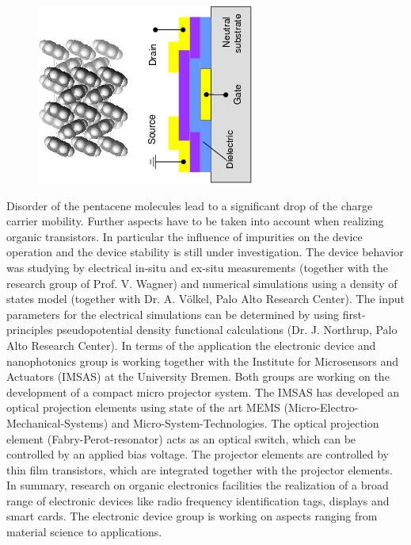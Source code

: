 \begin{figure}[ht]
  \begin{center}
    \includegraphics[width=\hsize,angle=-90]{Knipp/profknipp-fignano.png}
    \label{fig:profknipp}
   \end{center}
\end{figure}


Disorder of the pentacene molecules lead to a significant drop of the charge carrier
mobility. Further aspects have to be taken into account when realizing organic
transistors. In particular the influence of impurities on the device operation and the
device stability is still under investigation. The device behavior was studying by
electrical in-situ and ex-situ measurements (together with the research group of
Prof. V. Wagner) and numerical simulations using a density of states model (together with
Dr. A. V\"olkel, Palo Alto Research Center). The input parameters for the electrical
simulations can be determined by using first-principles pseudopotential density functional
calculations (Dr. J. Northrup, Palo Alto Research Center).  In terms of the application
the electronic device and nanophotonics group is working together with the Institute for
Microsensors and Actuators (IMSAS) at the University Bremen. Both groups are working on
the development of a compact micro projector system. The IMSAS has developed an optical
projection elements using state of the art MEMS (Micro-Electro-Mechanical-Systems) and
Micro-System-Technologies. The optical projection element (Fabry-Perot-resonator) acts as
an optical switch, which can be controlled by an applied bias voltage. The projector
elements are controlled by thin film transistors, which are integrated together with the
projector elements.  In summary, research on organic electronics facilities the
realization of a broad range of electronic devices like radio frequency identification
tags, displays and smart cards. The electronic device group is working on aspects ranging
from material science to applications.



